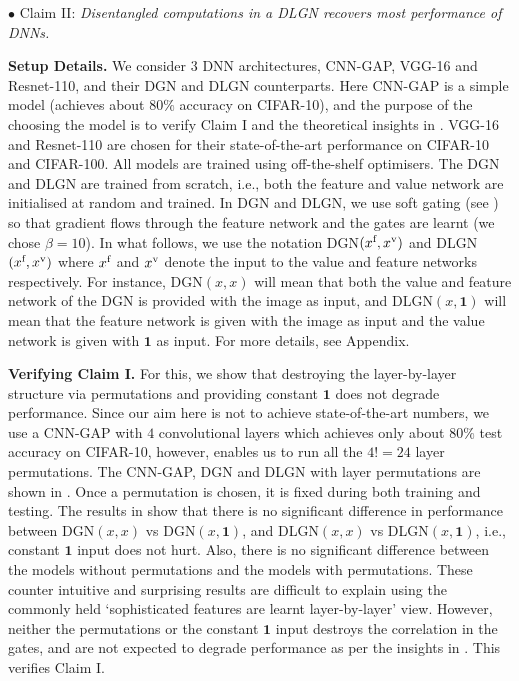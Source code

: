 $\bullet$ Claim II: \emph{Disentangled computations in a DLGN recovers most performance of DNNs.}

\textbf{Setup Details.} We consider $3$ DNN architectures, CNN-GAP, VGG-16 and Resnet-110, and their DGN and DLGN counterparts. Here CNN-GAP is a simple model (achieves about $80\%$ accuracy on CIFAR-10), and the purpose of the choosing the model is to verify  Claim I and the theoretical insights in . VGG-16 and Resnet-110 are chosen for their state-of-the-art performance on CIFAR-10 and CIFAR-100. All models are trained using off-the-shelf optimisers. The DGN and DLGN are trained from scratch, i.e., both the feature and value network are initialised at random and trained. In DGN and DLGN, we use soft gating (see ) so that gradient flows through the feature network and the gates are learnt (we chose $\beta=10$).  In what follows, we use the notation DGN$(x^{\text{f}},x^{\text{v}})$ and DLGN$(x^{\text{f}},x^{\text{v}})$ where $x^{\text{f}}$ and $x^{\text{v}}$ denote the input to the value and feature networks respectively. For instance, DGN$(x,x)$ will mean that both the value and feature network of the DGN is provided with the image as input, and DLGN$(x,\mathbf{1})$ will mean that the feature network is given with the image as input and the value network is given with $\mathbf{1}$ as input. For more details, see Appendix.


\textbf{Verifying Claim I.} For this, we show that destroying the layer-by-layer structure via permutations and providing constant $\mathbf{1}$ does not degrade performance. Since our aim here is not to achieve state-of-the-art numbers, we use a CNN-GAP with $4$ convolutional layers which achieves only about $80\%$ test accuracy on CIFAR-10, however, enables us to run all the $4!=24$ layer permutations. The CNN-GAP, DGN and DLGN with layer permutations are shown in . Once a permutation is chosen, it is fixed during both training and testing. The results in  show that there is no significant difference in performance between DGN$(x,x)$ vs DGN$(x,\mathbf{1})$, and DLGN$(x,x)$ vs DLGN$(x,\mathbf{1})$, i.e., constant $\mathbf{1}$ input does not hurt. Also, there is no significant difference between the models without permutations and the models with permutations.  These counter intuitive and surprising results are difficult to explain using the commonly held `sophisticated features are learnt layer-by-layer' view. However, neither the permutations or the constant $\mathbf{1}$ input destroys the correlation in the gates, and are not expected to degrade performance as per the insights in . This verifies Claim I.  %


